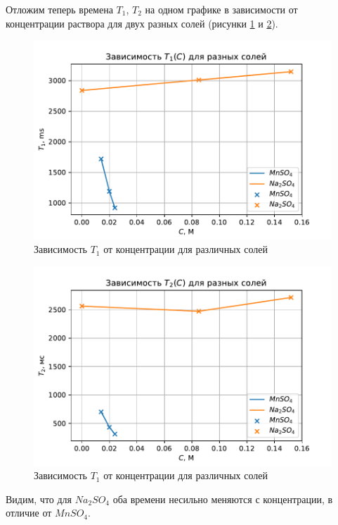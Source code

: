 Отложим теперь времена $ T_1 $, $ T_2 $ на одном графике в зависимости от концентрации раствора для двух разных солей (рисунки \ref{fig:t1-from-c} и \ref{fig:t2-from-c}).
\begin{figure}[H]
	\centering
	\includegraphics[width=0.8\linewidth]{data/T_1-from-C}
	\caption{Зависимость $ T_1 $ от концентрации для различных солей}
	\label{fig:t1-from-c}
\end{figure}
\begin{figure}[h]
	\centering
	\includegraphics[width=0.8\linewidth]{data/T_2-from-C}
	\caption{Зависимость $ T_1 $ от концентрации для различных солей}
	\label{fig:t2-from-c}
\end{figure}

Видим, что для $ Na_2 SO_4 $ оба времени несильно меняются с концентрации, в отличие от $ Mn SO_4 $.
